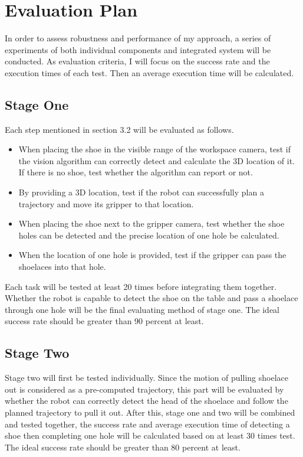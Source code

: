 \chapter{Evaluation Plan}


In order to assess robustness and performance of my approach, a series of experiments of both individual components and integrated system will be conducted. As evaluation criteria, I will focus on the success rate and the execution times of each test. Then an average execution time will be calculated.

\section{Stage One}
Each step mentioned in section 3.2 will be evaluated as follows. 
\begin{itemize}
 \item When placing the shoe in the visible range of the workspace camera, test if the vision algorithm can correctly detect and calculate the 3D location of it. If there is no shoe, test whether the algorithm can report or not.
 \item By providing a 3D location, test if the robot can successfully plan a trajectory and move its gripper to that location.
 \item When placing the shoe next to the gripper camera, test whether the shoe holes can be detected and the precise location of one hole be calculated.
 \item When the location of one hole is provided, test if the gripper can pass the shoelaces into that hole.
\end{itemize}
Each task will be tested at least 20 times before integrating them together. Whether the robot is capable to detect the shoe on the table and pass a shoelace through one hole will be the final evaluating method of stage one. The ideal success rate should be greater than 90 percent at least.

\section{Stage Two}
Stage two will first be tested individually. Since the motion of pulling shoelace out is considered as a pre-computed trajectory, this part will be evaluated by whether the robot can correctly detect the head of the shoelace and follow the planned trajectory to pull it out. After this, stage one and two will be combined and tested together, the success rate and average execution time of detecting a shoe then completing one hole will be calculated based on at least 30 times test. The ideal success rate should be greater than 80 percent at least.

